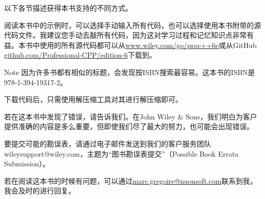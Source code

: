 以下各节描述获得本书支持的不同方式。


阅读本书中的示例时，可以选择手动输入所有代码，也可以选择使用本书附带的源代码文件。我建议您手动去敲所有代码，因为这对学习过程和记忆知识点非常有益。本书中使用的所有源代码都可以从\url{www.wiley.com/go/proc++6e}或从GitHub \url{github.com/Professional-CPP/edition-6}下载到。

\begin{myNotic}{Note}
因为许多书都有相似的标题，会发现按ISBN搜索最容易。这本书的ISBN是978-1-394-19317-2。
\end{myNotic}

下载代码后，只需使用解压缩工具对其进行解压缩即可。


若在这本书中发现了错误，请告诉我们。在John Wiley \& Sons，我们明白为客户提供准确的内容是多么重要，但即使我们尽了最大的努力，也可能会出现错误。

要提交可能的勘误表，请通过电子邮件发送到我们的客户服务团队wileysupport@wiley.com，主题为“图书勘误表提交”（Possible Book Errata Submission）。


若在阅读这本书的时候有问题，可以通过\url{marc.gregoire@nuonsoft.com}联系到我，我会及时的进行回复。
